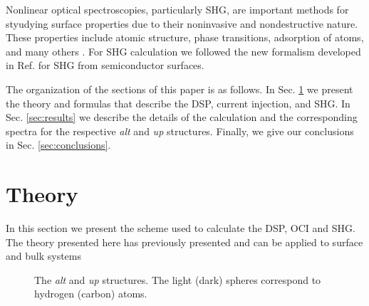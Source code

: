 \documentclass[pss]{wiley2sp} %
\begin{document}

Nonlinear optical spectroscopies, particularly SHG, are important methods for
styudying surface properties due to their noninvasive and nondestructive
nature. These properties include atomic structure, phase transitions,
adsorption of atoms, and many others \cite{dadap1997second,%
daum1993identification,mcgilp1994probing,power1995resonant,%
godefroy1996electric,salazar2014molecular,chen1981surface,%
mendoza1998microscopic}. For SHG calculation we followed
the new formalism developed in Ref. \cite{andersonPRB15} for SHG from
semiconductor surfaces.

The organization of the sections of this paper is as follows. In Sec.
\ref{sec:theory} we present the theory and formulas that describe the DSP,
current injection, and SHG. In Sec. \ref{sec:results} we describe the details
of the calculation and the corresponding spectra for the respective \emph{alt}
and \emph{up} structures. Finally, we give our conclusions in Sec.
\ref{sec:conclusions}.


\section{Theory}\label{sec:theory}

\begin{changed}
In this section we present the scheme used to calculate the DSP, OCI and SHG. The theory presented here has previously presented and can be applied to surface and bulk systems \cite{nastos2007full,mendoza2012optical,cabellos2011optical,sipe2000second,andersonPRB15}
\end{changed}

\begin{figure}[t]
\hfill
{}
\caption{The \emph{alt} and \emph{up} structures. The light
(dark) spheres correspond to hydrogen (carbon) atoms.\label{fig:structures}}
\end{figure}
\end{document}
